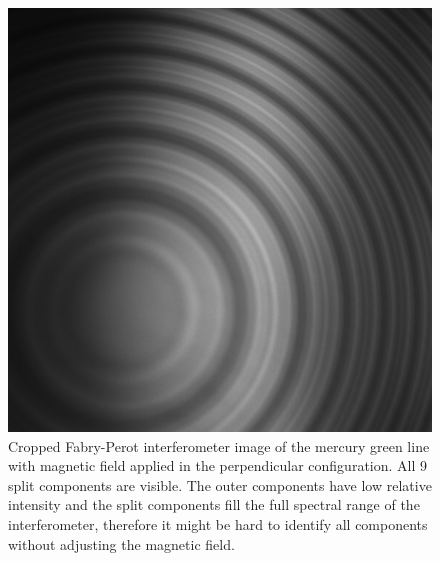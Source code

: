 \documentclass[11pt]{article}
\begin{document}
\begin{figure}[h!]
\begin{minipage}[t]{0.47\linewidth}
        \includegraphics[width=\linewidth]{hg green 9 lines cropped.jpeg}
        \captionsetup{justification=centering}
        \caption{Cropped Fabry-Perot interferometer image of the mercury green line with magnetic field applied in the perpendicular configuration. All 9 split components are visible. The outer components have low relative intensity and the split components fill the full spectral range of the interferometer, therefore it might be hard to identify all components without adjusting the magnetic field. }
    \end{minipage}
\end{figure}
\end{document}
